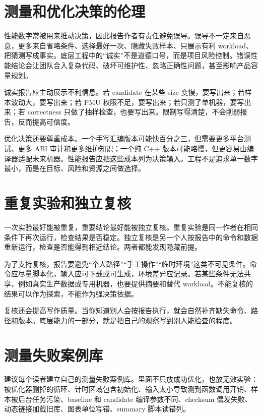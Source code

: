 \section{测量和优化决策的伦理}

性能数字常被用来推动决策，因此报告作者有责任避免误导。误导不一定来自恶意，更多来自省略条件、选择最好一次、隐藏失败样本、只展示有利 workload、把猜测写成事实。底层工程中的“诚实”不是道德口号，而是项目风险控制。错误性能结论会让团队合入复杂代码、破坏可维护性、忽略正确性问题，甚至影响产品容量规划。

诚实报告应主动展示不利信息。若 candidate 在某些 size 变慢，要写出来；若样本波动大，要写出来；若 PMU 权限不足，要写出来；若只测了单机器，要写出来；若 correctness 只做了抽样检查，也要写出来。限制写得清楚，不会削弱报告，反而提高可信度。

优化决策还要尊重成本。一个手写汇编版本可能快百分之三，但需要更多平台测试、更多 ABI 审计和更多维护知识；一个纯 C++ 版本可能略慢，但更容易由编译器适配未来机器。性能报告应把这些成本列为决策输入。工程不是追求单一数字最小，而是在目标、风险和资源之间做选择。

\section{重复实验和独立复核}

一次实验最好能被重复，重要结论最好能被独立复核。重复实验是同一作者在相同条件下再次运行，检查结果是否稳定。独立复核是另一个人按报告中的命令和数据重新运行，检查是否能得到相近结论。两者都能发现隐藏前提。

为了支持复核，报告要避免“个人路径”“手工操作”“临时环境”这类不可见条件。命令应尽量脚本化，输入应可下载或可生成，环境差异应记录。若某些条件无法共享，例如真实生产数据或专用机器，也要提供摘要和替代 workload。不能复核的结果可以作为探索，不能作为强决策依据。

复核还会提高写作质量。当你知道别人会按报告执行，就会自然补齐缺失命令、路径和版本。底层能力的一部分，就是把自己的观察写到别人能检查的程度。

\section{测量失败案例库}

建议每个读者建立自己的测量失败案例库。里面不只放成功优化，也放无效实验：被优化器删掉的循环、计时区域包含初始化、输入太小导致测到函数调用开销、样本被后台任务污染、baseline 和 candidate 编译参数不同、checksum 偶发失败、动态链接加载旧库、图表单位写错、summary 脚本读错列。

